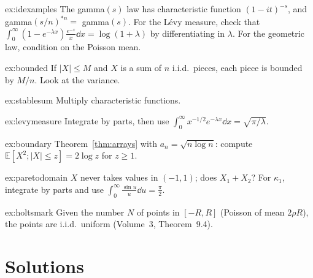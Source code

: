 \begin{hint}{ex:idexamples}
The gamma$(s)$ law has characteristic function $(1-it)^{-s}$, and gamma$(s/n)^{*n}=$ gamma$(s)$. For the L\'evy measure, check that
$\int_0^\infty(1-e^{-\lambda x})\frac{e^{-x}}x\dd x=\log(1+\lambda)$ by differentiating in $\lambda$. For the geometric law, condition on the Poisson mean.
\end{hint}
\begin{hint}{ex:bounded}
If $|X|\le M$ and $X$ is a sum of $n$ i.i.d.\ pieces, each piece is bounded by $M/n$. Look at the variance.
\end{hint}
\begin{hint}{ex:stablesum}
Multiply characteristic functions.
\end{hint}
\begin{hint}{ex:levymeasure}
Integrate by parts, then use $\int_0^\infty x^{-1/2}e^{-\lambda x}\dd x=\sqrt{\pi/\lambda}$.
\end{hint}
\begin{hint}{ex:boundary}
Theorem~\ref{thm:arrays} with $a_n=\sqrt{n\log n}$: compute $\mathbb E[X^2;|X|\le z]=2\log z$ for $z\ge1$.
\end{hint}
\begin{hint}{ex:paretodomain}
$X$ never takes values in $(-1,1)$; does $X_1+X_2$? For $\kappa_1$, integrate
by parts and use $\int_0^\infty\frac{\sin u}u\dd u=\frac\pi2$.
\end{hint}
\begin{hint}{ex:holtsmark}
Given the number $N$ of points in $[-R,R]$ (Poisson of mean $2\rho R$), the points are i.i.d.\ uniform (Volume~3, Theorem~9.4).
\end{hint}

\section{Solutions}

